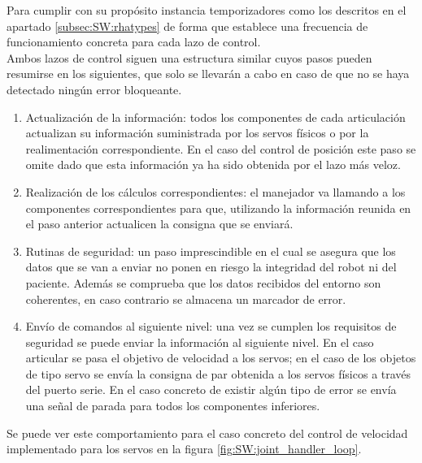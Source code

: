         Para cumplir con su propósito instancia temporizadores como los descritos en el apartado \ref{subsec:SW:rhatypes} de forma que establece una frecuencia de funcionamiento concreta para cada lazo de control.
        \\
        
        Ambos lazos de control siguen una estructura similar cuyos pasos pueden resumirse en los siguientes, que solo se llevarán a cabo en caso de que no se haya detectado ningún error bloqueante.
        \begin{enumerate}
            \item Actualización de la información: todos los componentes de cada articulación actualizan su información suministrada por los servos físicos o por la realimentación correspondiente. En el caso del control de posición este paso se omite dado que esta información ya ha sido obtenida por el lazo más veloz.
            \item Realización de los cálculos correspondientes: el manejador va llamando a los componentes correspondientes para que, utilizando la información reunida en el paso anterior actualicen la consigna que se enviará.
            \item Rutinas de seguridad: un paso imprescindible en el cual se asegura que los datos que se van a enviar no ponen en riesgo la integridad del robot ni del paciente. Además se comprueba que los datos recibidos del entorno son coherentes, en caso contrario se almacena un marcador de error.
            \item Envío de comandos al siguiente nivel: una vez se cumplen los requisitos de seguridad se puede enviar la información al siguiente nivel. En el caso articular se pasa el objetivo de velocidad a los servos; en el caso de los objetos de tipo servo se envía la consigna de par obtenida a los servos físicos a través del puerto serie. En el caso concreto de existir algún tipo de error se envía una señal de parada para todos los componentes inferiores.
        \end{enumerate}
        Se puede ver este comportamiento para el caso concreto del control de velocidad implementado para los servos en la figura \ref{fig:SW:joint_handler_loop}.

